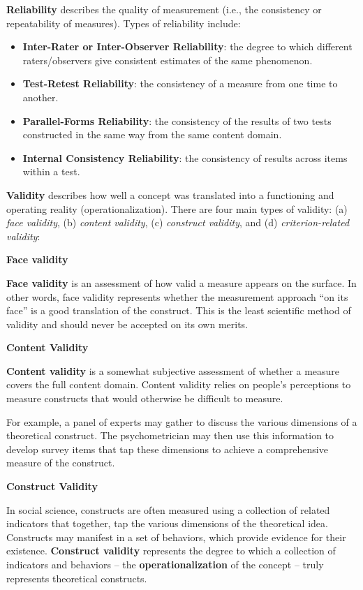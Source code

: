\documentclass[
]{book}
\providecommand{\tightlist}{%
  \setlength{\itemsep}{0pt}\setlength{\parskip}{0pt}}
\begin{document}
\textbf{Reliability} describes the quality of measurement (i.e., the consistency or repeatability of measures). Types of reliability include:

\begin{itemize}
\tightlist
\item
  \textbf{Inter-Rater or Inter-Observer Reliability}: the degree to which different raters/observers give consistent estimates of the same phenomenon.
\item
  \textbf{Test-Retest Reliability}: the consistency of a measure from one time to another.
\item
  \textbf{Parallel-Forms Reliability}: the consistency of the results of two tests constructed in the same way from the same content domain.
\item
  \textbf{Internal Consistency Reliability}: the consistency of results across items within a test.
\end{itemize}

\textbf{Validity} describes how well a concept was translated into a functioning and operating reality (operationalization). There are four main types of validity: (a) \emph{face validity}, (b) \emph{content validity}, (c) \emph{construct validity}, and (d) \emph{criterion-related validity}:

\textbf{Face validity}

\textbf{Face validity} is an assessment of how valid a measure appears on the surface. In other words, face validity represents whether the measurement approach ``on its face'' is a good translation of the construct. This is the least scientific method of validity and should never be accepted on its own merits.

\textbf{Content Validity}

\textbf{Content validity} is a somewhat subjective assessment of whether a measure covers the full content domain. Content validity relies on people's perceptions to measure constructs that would otherwise be difficult to measure.

For example, a panel of experts may gather to discuss the various dimensions of a theoretical construct. The psychometrician may then use this information to develop survey items that tap these dimensions to achieve a comprehensive measure of the construct.

\textbf{Construct Validity}

In social science, constructs are often measured using a collection of related indicators that together, tap the various dimensions of the theoretical idea. Constructs may manifest in a set of behaviors, which provide evidence for their existence. \textbf{Construct validity} represents the degree to which a collection of indicators and behaviors -- the \textbf{operationalization} of the concept -- truly represents theoretical constructs.
\end{document}
